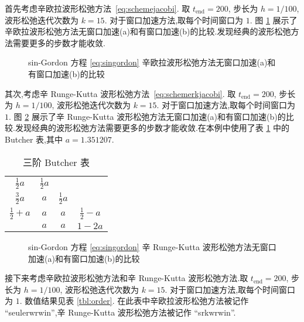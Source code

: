 首先考虑辛欧拉波形松弛方法~\eqref{eq:schemejacobi}. 取 $t_{\text{end}} = 200$, 步长为 $h = 1/100$, 波形松弛迭代次数为 $k=15$. 对于窗口加速方法,取每个时间窗口为 $1$. 图 \ref{fig:ex1seucom} 展示了辛欧拉波形松弛方法无窗口加速(a)和有窗口加速(b)的比较.发现经典的波形松弛方法需要更多的步数才能收敛.

\begin{figure}[h!]
  \centering
  \caption{sin-Gordon 方程 \eqref{eq:singordon} 辛欧拉波形松弛方法无窗口加速(a)和有窗口加速(b)的比较}
  \label{fig:ex1seucom}
\end{figure}

其次,考虑辛 Runge-Kutta 波形松弛方法~\eqref{eq:schemerkjacobi}. 取 $t_{\text{end}} = 200$, 步长为 $h = 1/100$, 波形松弛迭代次数为 $k=15$. 对于窗口加速方法,取每个时间窗口为 $1$. 图 \ref{fig:ex1srkcom} 展示了辛 Runge-Kutta 波形松弛方法无窗口加速(a)和有窗口加速(b)的比较.发现经典的波形松弛方法需要更多的步数才能收敛.在本例中使用了表 \ref{tbl:rk} 中的 Butcher 表,其中 $a = 1.351207$.

\begin{table}[h!]
  \centering
  \caption{三阶 Butcher 表}
  \label{tbl:rk}
  \begin{tabular}{c|ccc}
    $\frac{1}{2}a$ & $\frac{1}{2}a$ & & \\
    $\frac{3}{2}a$ & $a$ &$\frac{1}{2}a$  & \\
    $\frac{1}{2} + a$ & $a$ & $a$ &$\frac{1}{2}-a$\\
    \hline
    & $a$ &$a$ & $1-2a$\\
  \end{tabular}
\end{table}

\begin{figure}[h!]
  \centering
  \caption{sin-Gordon 方程 \eqref{eq:singordon} 辛 Runge-Kutta 波形松弛方法无窗口加速(a)和有窗口加速(b)的比较}
  \label{fig:ex1srkcom}
\end{figure}

接下来考虑辛欧拉波形松弛方法和辛 Runge-Kutta 波形松弛方法.取 $t_{\text{end}} = 200$, 步长为 $h = 1/100$, 波形松弛迭代次数为 $k=15$. 对于窗口加速方法,取每个时间窗口为 $1$. 数值结果见表 \ref{tbl:order}. 在此表中辛欧拉波形松弛方法被记作 ``seulerwrwin'',辛 Runge-Kutta 波形松弛方法被记作 ``srkwrwin''.

